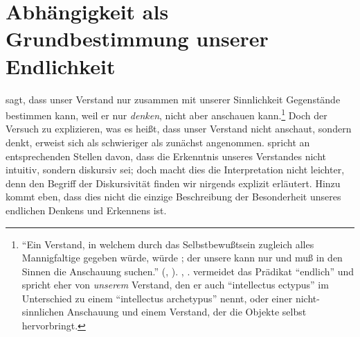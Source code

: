 \section{Abhängigkeit als Grundbestimmung unserer
Endlichkeit}\label{subsection:DiskursiverVerstandundsinnlicheAnschauung}
 sagt, dass unser Verstand nur zusammen mit unserer
Sinnlichkeit Gegenstände bestimmen kann, weil er nur
\emph{denken}, nicht aber anschauen kann.\footnote{\enquote{Ein Verstand, in
welchem durch das Selbstbewußtsein zugleich alles Mannigfaltige gegeben würde, würde ; der unsere kann nur
 und muß in den Sinnen die Anschauung
suchen.} \mkbibparens{\cite[][\S~16]{Kant:KritikderreinenVernunft2003},
\cite[][III: 110.26--29]{Kant:GesammelteWerke1900ff.}}.
\cite[Vgl.\ außerdem][\S\S~17, 21, B~311f.]{Kant:KritikderreinenVernunft2003},
\cite[][III: 112.20--33, 116.13--18, 212.16--21]{Kant:GesammelteWerke1900ff.}.
 vermeidet das Prädikat \enquote{endlich} und spricht eher
von \emph{unserem} Verstand, den er auch
\enquote{intellectus ectypus} im Unterschied zu einem \enquote{intellectus archetypus}
nennt, oder einer nicht-sinnlichen Anschauung und einem Verstand, der die
Objekte selbst hervorbringt.} Doch der Versuch zu
explizieren, was es heißt, dass unser Verstand nicht
anschaut, sondern denkt, erweist sich als schwieriger als zunächst angenommen.
 spricht an entsprechenden Stellen davon, dass die
Erkenntnis unseres Verstandes nicht intuitiv, sondern diskursiv sei; doch macht
dies die Interpretation nicht leichter, denn den Begriff der Diskursivität
finden wir nirgends explizit erläutert. Hinzu kommt eben, dass dies nicht die
einzige Beschreibung der Besonderheit unseres endlichen Denkens und Erkennens
ist.

